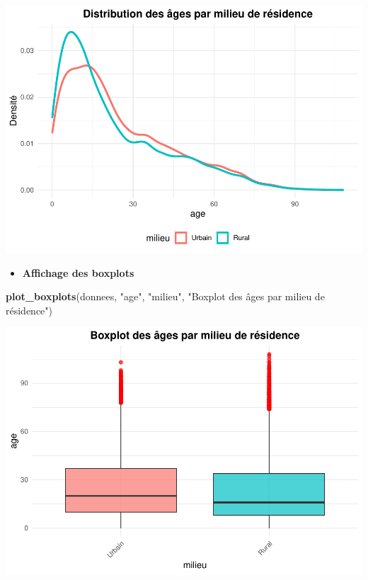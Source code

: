 \documentclass[
  12pt,
]{article}
\newenvironment{Shaded}{\begin{snugshade}}{\end{snugshade}}
\newcommand{\FunctionTok}[1]{\textcolor[rgb]{0.13,0.29,0.53}{\textbf{#1}}}
\newcommand{\NormalTok}[1]{#1}
\newcommand{\StringTok}[1]{\textcolor[rgb]{0.31,0.60,0.02}{#1}}
\providecommand{\tightlist}{%
  \setlength{\itemsep}{0pt}\setlength{\parskip}{0pt}}
\begin{document}
\includegraphics{Stat_non_para_files/figure-latex/unnamed-chunk-95-1.pdf}

\begin{itemize}
\tightlist
\item
  \textbf{Affichage des boxplots}
\end{itemize}

\begin{Shaded}
\begin{Highlighting}[]
\FunctionTok{plot\_boxplots}\NormalTok{(donnees, }\StringTok{"age"}\NormalTok{, }\StringTok{"milieu"}\NormalTok{, }\StringTok{"Boxplot des âges par milieu de résidence"}\NormalTok{)}
\end{Highlighting}
\end{Shaded}

\includegraphics{Stat_non_para_files/figure-latex/unnamed-chunk-96-1.pdf}
\end{document}
